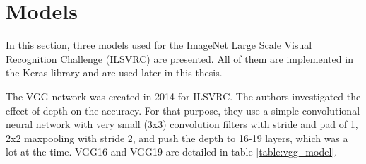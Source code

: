 \section{Models}
\label{chapter:ConvolutionalNeuralNetworks:section:Models}
In this section, three models used for the ImageNet Large Scale Visual Recognition Challenge (ILSVRC) are presented. All of them are implemented in the Keras \cite{chollet2015keras} library and are used later in this thesis.

The VGG network \cite{simonyan2014verydeep} was created in 2014 for ILSVRC. The authors investigated the effect of depth on the accuracy. For that purpose, they use a simple convolutional neural network with very small (3x3) convolution filters with stride and pad of 1, 2x2 maxpooling with stride 2, and push the depth to 16-19 layers, which was a lot at the time. VGG16 and VGG19 are detailed in table \ref{table:vgg_model}.

